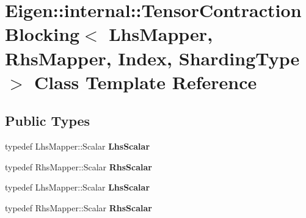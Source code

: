 \hypertarget{class_eigen_1_1internal_1_1_tensor_contraction_blocking}{}\section{Eigen\+:\+:internal\+:\+:Tensor\+Contraction\+Blocking$<$ Lhs\+Mapper, Rhs\+Mapper, Index, Sharding\+Type $>$ Class Template Reference}
\label{class_eigen_1_1internal_1_1_tensor_contraction_blocking}
\subsection*{Public Types}
\begin{DoxyCompactItemize}
\item 
\mbox{\label{class_eigen_1_1internal_1_1_tensor_contraction_blocking_a59fafb3d6ee84e8a1299b589c275776a}} 
typedef Lhs\+Mapper\+::\+Scalar {\bfseries Lhs\+Scalar}
\item 
\mbox{\label{class_eigen_1_1internal_1_1_tensor_contraction_blocking_ab749074ed0f69020390361becc873d65}} 
typedef Rhs\+Mapper\+::\+Scalar {\bfseries Rhs\+Scalar}
\item 
\mbox{\label{class_eigen_1_1internal_1_1_tensor_contraction_blocking_a59fafb3d6ee84e8a1299b589c275776a}} 
typedef Lhs\+Mapper\+::\+Scalar {\bfseries Lhs\+Scalar}
\item 
\mbox{\label{class_eigen_1_1internal_1_1_tensor_contraction_blocking_ab749074ed0f69020390361becc873d65}} 
typedef Rhs\+Mapper\+::\+Scalar {\bfseries Rhs\+Scalar}
\end{DoxyCompactItemize}
